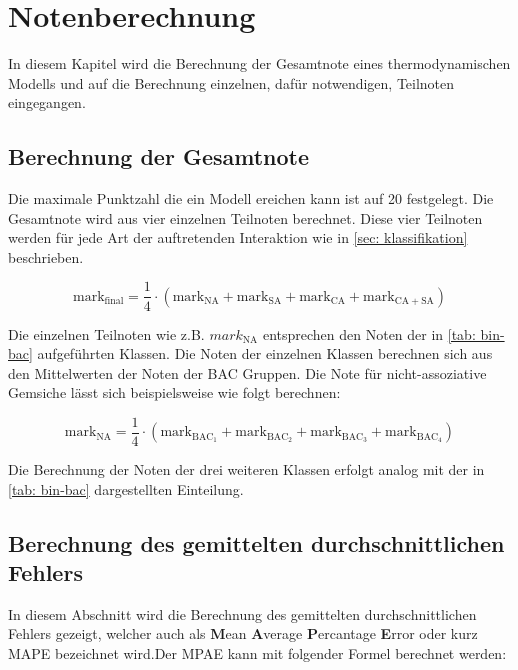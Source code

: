 \documentclass[../thesis.tex]{subfiles}
\begin{document}
\section{Notenberechnung}

In diesem Kapitel wird die Berechnung der Gesamtnote eines thermodynamischen Modells und auf die Berechnung einzelnen, dafür notwendigen, Teilnoten eingegangen.

\subsection{Berechnung der Gesamtnote}
Die maximale Punktzahl die ein Modell ereichen kann ist auf 20 festgelegt. Die Gesamtnote wird aus vier einzelnen Teilnoten berechnet. Diese vier Teilnoten werden für jede Art der auftretenden Interaktion wie in \autoref{sec: klassifikation} beschrieben.

\begin{equation}
	\mathrm{mark}_{\mathrm{final}} = \dfrac{1}{4} \cdot \left( 
		\mathrm{mark}_{\mathrm{NA}} + \mathrm{mark}_{\mathrm{SA}} + \mathrm{mark}_{\mathrm{CA}} + \mathrm{mark}_{\mathrm{CA + SA}} 
	 \right)
	 \label{eq: mark_final}
\end{equation}

Die einzelnen Teilnoten wie z.B. $mark_{\mathrm{NA}}$ entsprechen den Noten der in \autoref{tab: bin-bac} aufgeführten Klassen. Die Noten der einzelnen Klassen berechnen sich aus den Mittelwerten der Noten der BAC Gruppen. Die Note für nicht-assoziative Gemsiche lässt sich beispielsweise wie folgt berechnen:

\begin{equation}
	\mathrm{mark}_{\mathrm{NA}} = \dfrac{1}{4} \cdot \left(
		\mathrm{mark}_{\mathrm{BAC_1}} + \mathrm{mark}_{\mathrm{BAC_2}} + \mathrm{mark}_{\mathrm{BAC_3}} + \mathrm{mark}_{\mathrm{BAC_4}}
	\right)
\end{equation}

Die Berechnung der Noten der drei weiteren Klassen erfolgt analog mit der in \autoref{tab: bin-bac} dargestellten Einteilung.

\subsection{Berechnung des gemittelten durchschnittlichen Fehlers}
In diesem Abschnitt wird die Berechnung des gemittelten durchschnittlichen Fehlers gezeigt, welcher auch als \textbf{M}ean \textbf{A}verage \textbf{P}ercantage \textbf{E}rror oder kurz MAPE bezeichnet wird.Der MPAE kann mit folgender Formel berechnet werden:
\end{document}
